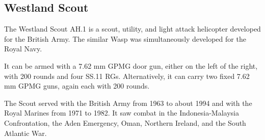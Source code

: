 \subsection{Westland Scout}

The Westland Scout AH.1 is a scout, utility, and light attack helicopter developed for the British Army. The similar Wasp was simultaneously developed for the Royal Navy.

It can be armed with a 7.62 mm GPMG door gun, either on the left of the right, with 200 rounds and four SS.11 RGs. Alternatively, it can carry two fixed 7.62 mm GPMG guns, again each with 200 rounds.

The Scout served with the British Army from 1963 to about 1994 and with the Royal Marines from 1971 to 1982. It saw combat in the Indonesia-Malaysia Confrontation, the Aden Emergency, Oman, Northern Ireland, and the South Atlantic War.
